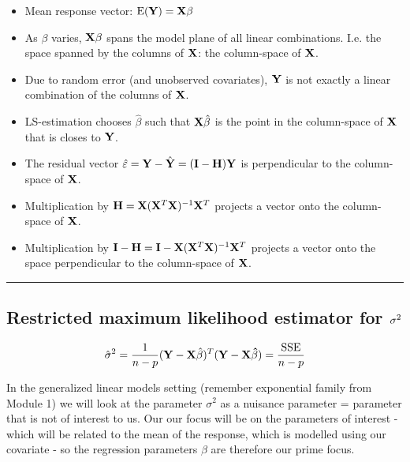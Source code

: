 \documentclass[
]{article}
\providecommand{\tightlist}{%
  \setlength{\itemsep}{0pt}\setlength{\parskip}{0pt}}
\begin{document}
\begin{itemize}
\tightlist
\item
  Mean response vector: \(\text{E}({\bf Y})={\bf X}{\bf \beta}\)
\item
  As \(\beta\) varies, \({\bf X}\beta\) spans the model plane of all
  linear combinations. I.e. the space spanned by the columns of
  \({\bf X}\): the column-space of \({\bf X}\).
\item
  Due to random error (and unobserved covariates), \({\bf Y}\) is not
  exactly a linear combination of the columns of \({\bf X}\).
\item
  LS-estimation chooses \(\hat{\beta}\) such that \({\bf X}\hat{\beta}\)
  is the point in the column-space of \({\bf X}\) that is closes to
  \({\bf Y}\).
\item
  The residual vector
  \(\hat{\varepsilon}={\bf Y}-\hat{{\bf Y}}=({\bf I-H}){\bf Y}\) is
  perpendicular to the column-space of \({\bf X}\).
\item
  Multiplication by \({\bf H}={\bf X}({\bf X}^T{\bf X})^{-1}{\bf X}^T\)
  projects a vector onto the column-space of \({\bf X}\).
\item
  Multiplication by
  \({\bf I-H}={\bf I}-{\bf X}({\bf X}^T{\bf X})^{-1}{\bf X}^T\) projects
  a vector onto the space perpendicular to the column-space of
  \({\bf X}\).
\end{itemize}

\begin{center}\rule{0.5\linewidth}{0.5pt}\end{center}

\hypertarget{restricted-maximum-likelihood-estimator-for-bf-sigma2}{%
\subsection{\texorpdfstring{Restricted maximum likelihood estimator for
\({\bf \sigma}^2\)}{Restricted maximum likelihood estimator for \{\textbackslash bf \textbackslash sigma\}\^{}2}}\label{restricted-maximum-likelihood-estimator-for-bf-sigma2}}

\[ \hat{\sigma}^2=\frac{1}{n-p}({\bf Y}-{\bf X}{\hat{\beta}})^T({\bf Y}-{\bf X}{\bf \hat{\beta}})=\frac{\text{SSE}}{n-p}\]

In the generalized linear models setting (remember exponential family
from Module 1) we will look at the parameter \(\sigma^2\) as a nuisance
parameter = parameter that is not of interest to us. Our our focus will
be on the parameters of interest - which will be related to the mean of
the response, which is modelled using our covariate - so the regression
parameters \(\beta\) are therefore our prime focus.
\end{document}
